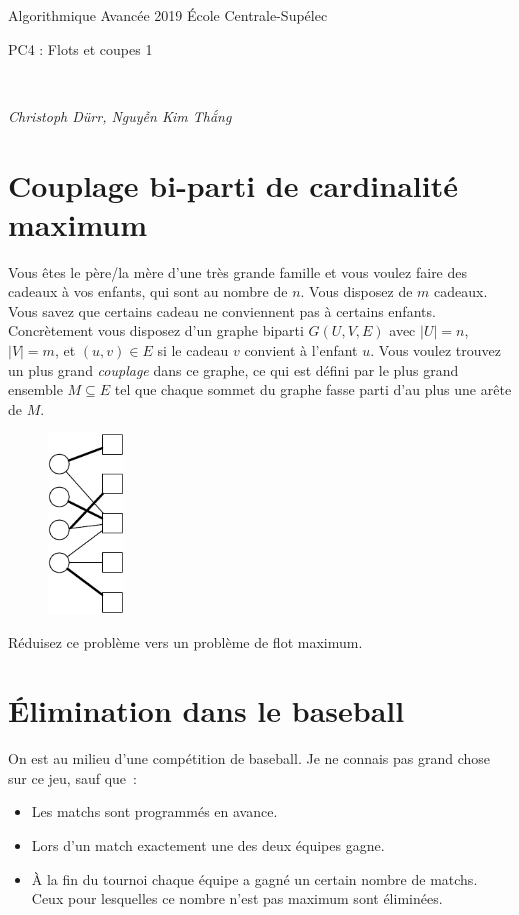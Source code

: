 \documentclass[12pt]{article}
\newcommand{\MakeScribeTop}[1]{
\noindent
\begin{framed}
\noindent
 Algorithmique Avancée 2019
 \hfill
 École Centrale-Supélec
 \\[1em]
 \centerline{ \Large
#1
 }
 \\[1em]
\centerline{  \it Christoph Dürr, Nguyễn Kim Thắng}
\end{framed}
}
\begin{document}
    \MakeScribeTop{PC4 : Flots et coupes 1}

\section{Couplage bi-parti de cardinalité maximum}

Vous êtes le père/la mère d'une très grande famille et vous voulez faire des cadeaux à vos enfants, qui sont au nombre de $n$.  Vous disposez de $m$ cadeaux.  Vous savez que certains cadeau ne conviennent pas à certains enfants. Concrètement vous disposez d'un graphe biparti $G(U,V,E)$ avec $|U|=n$, $|V|=m$, et $(u,v)\in E$ si le cadeau $v$ convient à l'enfant $u$.  Vous voulez trouvez un plus grand \emph{couplage} dans ce graphe, ce qui est défini par le plus grand ensemble $M\subseteq E$ tel que chaque sommet du graphe fasse parti d'au plus une arête de $M$. 


\begin{figure}[h]
	\centerline{\includegraphics[width=2cm]{couplage.pdf}}
\end{figure}


Réduisez ce problème vers un problème de flot maximum.


\section{Élimination dans le baseball}


On est au milieu d'une compétition de baseball.
Je ne connais pas grand chose sur ce jeu, sauf que~:
\begin{itemize}
	\item Les matchs sont programmés en avance.
	\item Lors d'un match exactement une des deux équipes gagne.
	\item À la fin du tournoi chaque équipe a gagné un certain nombre de matchs. Ceux pour lesquelles ce nombre n'est pas maximum sont éliminées.
\end{itemize}
\end{document}
